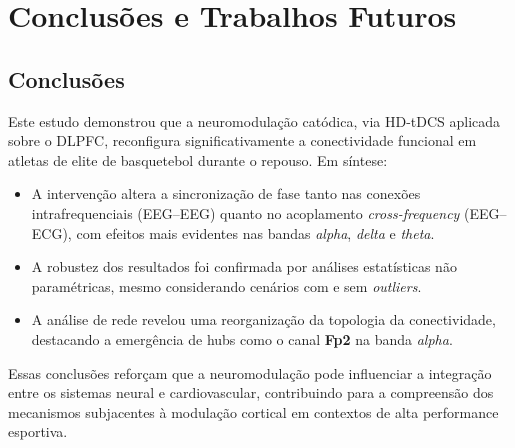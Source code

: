 \chapter{Conclusões e Trabalhos Futuros}
\label{chap:conclusoes_e_trabalhos_futuros}
\section{Conclusões}
Este estudo demonstrou que a neuromodulação catódica, via HD-tDCS aplicada sobre o DLPFC, reconfigura significativamente a conectividade funcional em atletas de elite de basquetebol durante o repouso. Em síntese:
\begin{itemize}
    \item A intervenção altera a sincronização de fase tanto nas conexões intrafrequenciais (EEG--EEG) quanto no acoplamento \textit{cross-frequency} (EEG--ECG), com efeitos mais evidentes nas bandas \emph{alpha}, \emph{delta} e \emph{theta}.
    \item A robustez dos resultados foi confirmada por análises estatísticas não paramétricas, mesmo considerando cenários com e sem \textit{outliers}.
    \item A análise de rede revelou uma reorganização da topologia da conectividade, destacando a emergência de hubs como o canal \textbf{Fp2} na banda \emph{alpha}.
\end{itemize}
Essas conclusões reforçam que a neuromodulação pode influenciar a integração entre os sistemas neural e cardiovascular, contribuindo para a compreensão dos mecanismos subjacentes à modulação cortical em contextos de alta performance esportiva.

